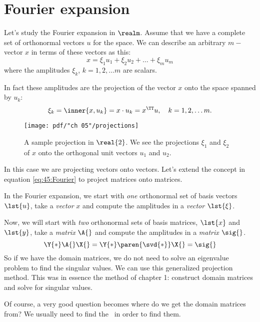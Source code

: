 \section{Fourier expansion}
Let's study the Fourier expansion in $\realm$.\cite[p. 299]{Meyer} Assume that we have a complete set of orthonormal vectors $u$ for the space. We can describe an arbitrary $m-$vector $x$ in terms of these vectors as this:
\begin{equation}
  x = \xi_{1} u_{1} + \xi_{2} u_{2} + \dots + \xi_{m} u_{m}
  \label{eq:45:Fourier}
\end{equation}
where the amplitudes $\xi_{k}$, $k=1,2,\dots m$ are scalars.

In fact these amplitudes are the projection of the vector $x$ onto the space spanned by $u_{k}$:
\begin{equation}
  \xi_{k} = \inner{x,u_{k}} = x\cdot u_{k} = x^{\TT}u, \quad k=1,2,\dots m.
\end{equation}

\begin{figure}[htbp] %
   \centering
   \texttt{[image: pdf/"ch 05"/projections]} 
   \caption[A sample projection in $\real{2}$]{A sample projection in $\real{2}$. We see the projections $\xi_{1}$ and $\xi_{2}$ of $x$ onto the orthogonal unit vectors $u_{1}$ and $u_{2}$.}
   \label{fig:45:projections}
\end{figure}

In this case we are projecting vectors onto vectors. Let's extend the concept in equation \eqref{eq:45:Fourier} to project matrices onto matrices. 

In the Fourier expansion, we start with \emph{one} orthonormal set of basis vectors $\lst{u}$, take a \emph{vector} $x$ and compute the amplitudes in a \emph{vector} $\lst{\xi}$.

Now, we will start with \emph{two} orthonormal sets of basis matrices, $\lst{x}$ and $\lst{y}$, take a \emph{matrix} $\A{}$ and compute the amplitudes in a \emph{matrix} $\sig{}$.
\begin{equation}
  \Y{*} \A{} \X{} = \Y{*} \paren{ \svd{*} } \X{} = \sig{}
\end{equation}
So if we have the domain matrices, we do not need to solve an eigenvalue problem to find the singular values. We can use this generalized projection method. This was in essence the method of chapter 1: construct domain matrices and solve for singular values.

Of course, a very good question becomes where do we get the domain matrices from? We usually need to find the \svdl \ in order to find them.

